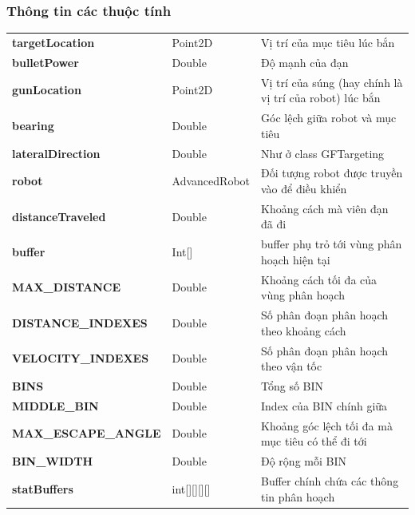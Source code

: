 \documentclass[14pt]{article}
\begin{document}
\subsubsection{Thông tin các thuộc tính}
\begin{tabular}{llp{5cm}}
\textbf{targetLocation}&Point2D&Vị trí của mục tiêu lúc bắn\\
\textbf{bulletPower}&Double&Độ mạnh của đạn\\
\textbf{gunLocation}&Point2D&Vị trí của súng (hay chính là vị trí của robot) lúc bắn\\
\textbf{bearing}&Double&Góc lệch giữa robot và mục tiêu\\
\textbf{lateralDirection}&Double&Như ở class GFTargeting\\
\textbf{robot}&AdvancedRobot&Đối tượng robot được truyền vào để điều khiển\\
\textbf{distanceTraveled}&Double&Khoảng cách mà viên đạn đã đi\\
\textbf{buffer}&Int[]&buffer phụ trỏ tới vùng phân hoạch hiện tại\\
\textbf{MAX\_DISTANCE}&Double&Khoảng cách tối đa của vùng phân hoạch\\
\textbf{DISTANCE\_INDEXES}&Double&Số phân đoạn phân hoạch theo khoảng cách\\
\textbf{VELOCITY\_INDEXES}&Double&Số phân đoạn phân hoạch theo vận tốc\\
\textbf{BINS}&Double&Tổng số BIN\\
\textbf{MIDDLE\_BIN}&Double&Index của BIN chính giữa\\
\textbf{MAX\_ESCAPE\_ANGLE}&Double&Khoảng góc lệch tối đa mà mục tiêu có thể đi tới\\
\textbf{BIN\_WIDTH}&Double&Độ rộng mỗi BIN\\
\textbf{statBuffers}&int[][][][]&Buffer chính chứa các thông tin phân hoạch\\
\end{tabular}
\end{document}
